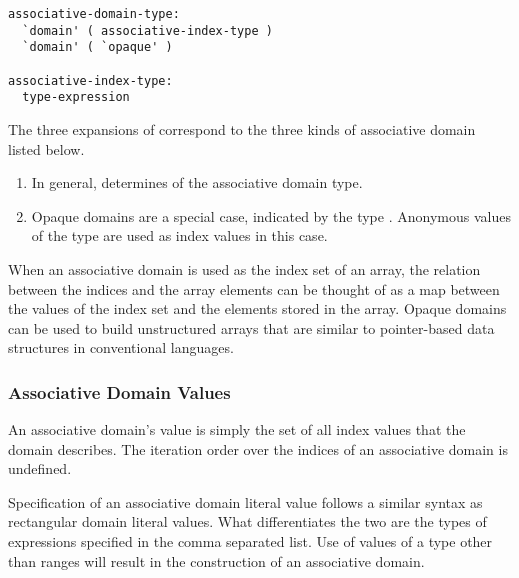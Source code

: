 \begin{syntax}
\begin{verbatim}
associative-domain-type:
  `domain' ( associative-index-type )
  `domain' ( `opaque' )

associative-index-type:
  type-expression
\end{verbatim}
\end{syntax}

The three expansions of  correspond to the three
kinds of associative domain listed below.
\begin{enumerate} 
\item In general,  determines 
of the associative domain type.
\item Opaque domains are a special case, indicated by the type .
Anonymous values of the type  are used as index values
in this case.
\end{enumerate}

When an associative domain is used as the index set of an array, the relation
between the indices and the array elements can be thought of as a map between
the values of the index set and the elements stored in the array.
Opaque domains can be used to build unstructured arrays that are similar to
pointer-based data structures in conventional languages.

\subsubsection{Associative Domain Values}
\label{Associative_Domain_Values}

An associative domain's value is simply the set of all index values
that the domain describes.  The iteration order over the indices of
an associative domain is undefined.


Specification of an associative domain literal value follows a similar syntax as
rectangular domain literal values.  What differentiates the two are the types 
of expressions specified in the comma separated list.  Use of values of a 
type other than ranges will result in the construction of an associative domain.  

